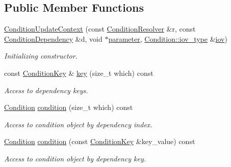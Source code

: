 \subsection*{Public Member Functions}
\begin{DoxyCompactItemize}
\item 
\hyperlink{class_d_d4hep_1_1_conditions_1_1_condition_update_context_a259338f84924fdd338add25e7f951858}{Condition\+Update\+Context} (const \hyperlink{class_d_d4hep_1_1_conditions_1_1_condition_resolver}{Condition\+Resolver} \&r, const \hyperlink{class_d_d4hep_1_1_conditions_1_1_condition_dependency}{Condition\+Dependency} \&d, void $\ast$\hyperlink{class_d_d4hep_1_1_conditions_1_1_condition_update_context_adad82de460a5c71b568e73e2f76923ba}{parameter}, \hyperlink{class_d_d4hep_1_1_conditions_1_1_condition_ad84300e226b2085ec5e9db7f47be5539}{Condition\+::iov\+\_\+type} \&\hyperlink{class_d_d4hep_1_1_conditions_1_1_condition_update_context_acdeb1015159a6df55df3c3e614651d4e}{iov})
\begin{DoxyCompactList}\small\item\em Initializing constructor. \end{DoxyCompactList}\item 
const \hyperlink{class_d_d4hep_1_1_conditions_1_1_condition_key}{Condition\+Key} \& \hyperlink{class_d_d4hep_1_1_conditions_1_1_condition_update_context_a382048ef36f31c77ec8d0b4266277fa9}{key} (size\+\_\+t which) const
\begin{DoxyCompactList}\small\item\em Access to dependency keys. \end{DoxyCompactList}\item 
\hyperlink{class_d_d4hep_1_1_conditions_1_1_condition}{Condition} \hyperlink{class_d_d4hep_1_1_conditions_1_1_condition_update_context_a5e1a9f1553a22cf6d595b77d6a5519ad}{condition} (size\+\_\+t which) const
\begin{DoxyCompactList}\small\item\em Access to condition object by dependency index. \end{DoxyCompactList}\item 
\hyperlink{class_d_d4hep_1_1_conditions_1_1_condition}{Condition} \hyperlink{class_d_d4hep_1_1_conditions_1_1_condition_update_context_aa12850a6ffa370ee58f4516a07363249}{condition} (const \hyperlink{class_d_d4hep_1_1_conditions_1_1_condition_key}{Condition\+Key} \&key\+\_\+value) const
\begin{DoxyCompactList}\small\item\em Access to condition object by dependency key. \end{DoxyCompactList}\item 

\end{DoxyCompactItemize}
